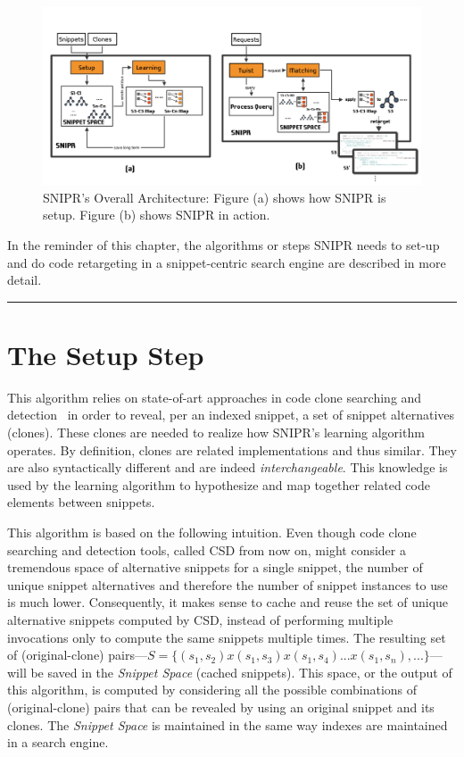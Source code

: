 \begin{figure}[!ht]
    \centering
    \includegraphics[width=\textwidth]{images/SnippetRetargetingApproach}
    \caption{SNIPR's Overall Architecture: Figure (a) shows how SNIPR is setup. Figure (b) shows SNIPR in action.}
    \label{fig:sniprentire}
\end{figure}

In the reminder of this chapter, the algorithms or steps \uppercase{SnipR} needs to set-up and do code retargeting in a snippet-centric search engine are described in more detail. 

\fancybreak{\pfbreakdisplay}

\section{The Setup Step}
\label{sec:precomputation}

This algorithm relies on state-of-art approaches in code clone searching and detection~\cite{Jiang:2007cj, Roh:2010ts} in order to reveal, per an indexed snippet, a set of snippet alternatives (clones). These clones are needed to realize how \uppercase{SnipR}'s learning algorithm operates. By definition, clones are related implementations and thus similar. They are also syntactically different and are indeed \emph{interchangeable}. This knowledge is used by the learning algorithm to hypothesize and map together related code elements between snippets. 

This algorithm is based on the following intuition. Even though code clone searching and detection tools, called CSD from now on, might consider a tremendous space of alternative snippets for a single snippet, the number of unique snippet alternatives and therefore the number of snippet instances to use is much lower. Consequently, it makes sense to cache and reuse the set of unique alternative snippets computed by CSD, instead of performing multiple invocations only to compute the same snippets multiple times. The resulting set of (original-clone) pairs---$S = \{(s_1, s_2) x (s_1, s_3) x (s_1, s_4) ... x (s_1, s_n), ...\}$---will be saved in the \emph{Snippet Space} (cached snippets). This space, or the output of this algorithm, is computed by considering all the possible combinations of (original-clone) pairs that can be revealed by using an original snippet and its clones. The \emph{Snippet Space} is maintained in the same way indexes are maintained in a search engine.

